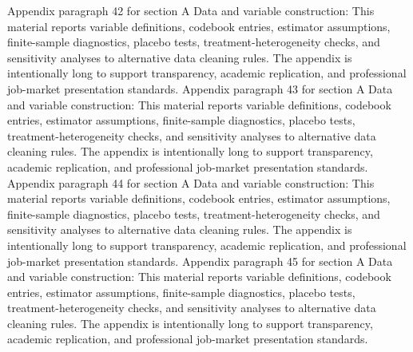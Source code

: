 \documentclass[preprint,12pt]{elsarticle}
\begin{document}
Appendix paragraph 42 for section A Data and variable construction: This material reports variable definitions, codebook entries, estimator assumptions, finite-sample diagnostics, placebo tests, treatment-heterogeneity checks, and sensitivity analyses to alternative data cleaning rules. The appendix is intentionally long to support transparency, academic replication, and professional job-market presentation standards.
Appendix paragraph 43 for section A Data and variable construction: This material reports variable definitions, codebook entries, estimator assumptions, finite-sample diagnostics, placebo tests, treatment-heterogeneity checks, and sensitivity analyses to alternative data cleaning rules. The appendix is intentionally long to support transparency, academic replication, and professional job-market presentation standards.
Appendix paragraph 44 for section A Data and variable construction: This material reports variable definitions, codebook entries, estimator assumptions, finite-sample diagnostics, placebo tests, treatment-heterogeneity checks, and sensitivity analyses to alternative data cleaning rules. The appendix is intentionally long to support transparency, academic replication, and professional job-market presentation standards.
Appendix paragraph 45 for section A Data and variable construction: This material reports variable definitions, codebook entries, estimator assumptions, finite-sample diagnostics, placebo tests, treatment-heterogeneity checks, and sensitivity analyses to alternative data cleaning rules. The appendix is intentionally long to support transparency, academic replication, and professional job-market presentation standards.
\end{document}
